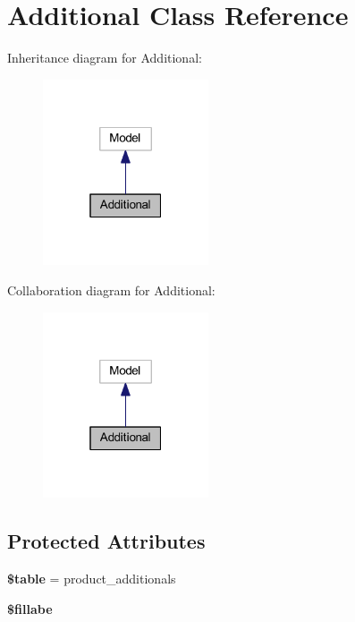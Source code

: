 \hypertarget{class_app_1_1_models_1_1_product_1_1_additional}{}\section{Additional Class Reference}
\label{class_app_1_1_models_1_1_product_1_1_additional}


Inheritance diagram for Additional\+:
\nopagebreak
\begin{figure}[H]
\begin{center}
\leavevmode
\includegraphics[width=139pt]{class_app_1_1_models_1_1_product_1_1_additional__inherit__graph}
\end{center}
\end{figure}


Collaboration diagram for Additional\+:
\nopagebreak
\begin{figure}[H]
\begin{center}
\leavevmode
\includegraphics[width=139pt]{class_app_1_1_models_1_1_product_1_1_additional__coll__graph}
\end{center}
\end{figure}
\subsection*{Protected Attributes}
\begin{DoxyCompactItemize}
\item 
\mbox{\label{class_app_1_1_models_1_1_product_1_1_additional_ae8876a14058f368335baccf35af4a22b}} 
{\bfseries \$table} = \textquotesingle{}product\+\_\+additionals\textquotesingle{}
\item 
{\bfseries \$fillabe}
\end{DoxyCompactItemize}


